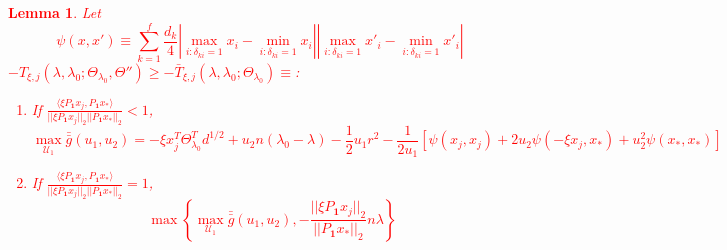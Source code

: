 \documentclass{article}
\newtheorem{lemma}{Lemma}
\providecommand{\note}[1]{\textcolor{red}{#1}}
\begin{document}
\note{
\begin{lemma}
    Let
    \begin{equation}
        \label{eq:prod}
        \psi(x,x')\equiv\sum_{k=1}^f\frac{d_k}{4}\left|\max_{i:\delta_{ki}=1}x_i-\min_{i:\delta_{ki}=1}x_i\right|\left|\max_{i:\delta_{ki}=1}x'_i-\min_{i:\delta_{ki}=1}x'_i\right|
    \end{equation}
    $-T_{\xi,j}(\lambda,\lambda_0;\Theta_{\lambda_0},\Theta'')\geq-\bar{T}_{\xi,j}(\lambda,\lambda_0;\Theta_{\lambda_0})\equiv$:
    \begin{enumerate}
        \item If $\frac{\langle\xi P_{\mathbf{1}}x_j,P_{\mathbf{1}}x_*\rangle}{||\xi P_{\mathbf{1}}x_j||_2||P_{\mathbf{1}}x_*||_2}<1$, 
        \begin{equation}
            \label{eq:gbbar}
            \max_{\mathcal{U}_1}\bar{\bar{g}}(u_1,u_2)=-\xi x_j^T\Theta_{\lambda_0}^Td^{1/2}+u_2n(\lambda_0-\lambda)-\frac{1}{2}u_1r^2-\frac{1}{2u_1}\left[\psi(x_j,x_j)+2u_2\psi(-\xi x_j,x_*)+u_2^2\psi(x_*,x_*)\right]
        \end{equation}
        \item If $\frac{\langle\xi P_{\mathbf{1}}x_j,P_{\mathbf{1}}x_*\rangle}{||\xi P_{\mathbf{1}}x_j||_2||P_{\mathbf{1}}x_*||_2}=1$,
        \begin{equation}
            \max\left\{\max_{\mathcal{U}_1}\bar{\bar{g}}(u_1,u_2),-\frac{||\xi P_\mathbf{1}x_j||_2}{||P_\mathbf{1}x_*||_2}n\lambda\right\}
        \end{equation}
    \end{enumerate}
\end{lemma}
}
\end{document}
